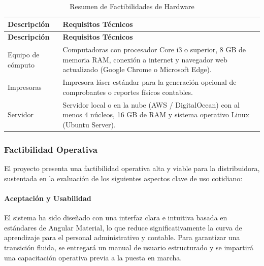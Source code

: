 {
\small
{}
\setlength{\parindent}{0pt}
\begin{xltabular}{\linewidth}{
    >{\raggedright\arraybackslash}p{4.0cm} 
    >{\raggedright\arraybackslash}X
}

    \caption{Resumen de Factibilidades de Hardware} \label{tab:fact_hardware} \\
    \toprule
    \textbf{Descripción} & \textbf{Requisitos Técnicos} \\
    \midrule
    \endfirsthead

    \toprule
    \textbf{Descripción} & \textbf{Requisitos Técnicos} \\
    \midrule
    \endhead

    \endfoot

    \bottomrule
\endlastfoot

    Equipo de cómputo & Computadoras con procesador Core i3 o superior, 8 GB de memoria RAM, conexión a internet y navegador web actualizado (Google Chrome o Microsoft Edge). \\
    \addlinespace
    Impresoras & Impresora láser estándar para la generación opcional de comprobantes o reportes físicos contables. \\
    \addlinespace
    Servidor & Servidor local o en la nube (AWS / DigitalOcean) con al menos 4 núcleos, 16 GB de RAM y sistema operativo Linux (Ubuntu Server). \\
\end{xltabular}
}

\subsubsection{Factibilidad Operativa}

El proyecto presenta una factibilidad operativa alta y viable para la distribuidora, sustentada en la evaluación de los siguientes aspectos clave de uso cotidiano:

\paragraph{Aceptación y Usabilidad} El sistema ha sido diseñado con una interfaz clara e intuitiva basada en estándares de Angular Material, lo que reduce significativamente la curva de aprendizaje para el personal administrativo y contable. Para garantizar una transición fluida, se entregará un manual de usuario estructurado y se impartirá una capacitación operativa previa a la puesta en marcha.


